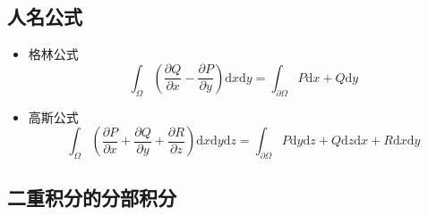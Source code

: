 \documentclass{article}
\begin{document}
\subsection{人名公式}

\begin{itemize}
    \item 格林公式 \[ \int_\Omega \left(\frac{\partial Q}{\partial x} - \frac{\partial P}{\partial y}\right) \mathrm{d}x \mathrm{d}y = \int_{\partial \Omega} P \mathrm{d}x + Q \mathrm{d}y \]
    \item 高斯公式 \[ \int_\Omega \left(\frac{\partial P}{\partial x} + \frac{\partial Q}{\partial y} + \frac{\partial R}{\partial z}\right) \mathrm{d}x \mathrm{d}y \mathrm{d}z = \int_{\partial \Omega} P \mathrm{d}y \mathrm{d}z + Q \mathrm{d}z \mathrm{d}x + R \mathrm{d}x \mathrm{d}y \]
\end{itemize}

\subsection{二重积分的分部积分}
\end{document}
